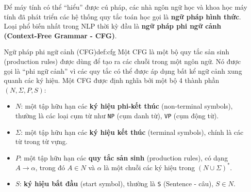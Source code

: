 Để máy tính có thể “hiểu” được cú pháp, các nhà ngôn ngữ học và khoa học máy tính đã phát triển các hệ thống quy tắc toán học gọi là \textbf{ngữ pháp hình thức}. Loại phổ biến nhất trong NLP thời kỳ đầu là \textbf{ngữ pháp phi ngữ cảnh (Context-Free Grammar - CFG)}.

\begin{definition}{Ngữ pháp phi ngữ cảnh (CFG)}{def:cfg}
    Một CFG là một bộ quy tắc sản sinh (production rules) được dùng để tạo ra các chuỗi trong một ngôn ngữ. Nó được gọi là “phi ngữ cảnh” vì các quy tắc có thể được áp dụng bất kể ngữ cảnh xung quanh các ký hiệu. Một CFG được định nghĩa bởi một bộ 4 thành phần $(N, \Sigma, P, S)$:
    \begin{itemize}
        \item $N$: một tập hữu hạn các \textbf{ký hiệu phi-kết thúc} (non-terminal symbols), thường là các loại cụm từ như \texttt{NP} (cụm danh từ), \texttt{VP} (cụm động từ).
        \item $\Sigma$: một tập hữu hạn các \textbf{ký hiệu kết thúc} (terminal symbols), chính là các từ trong từ vựng.
        \item $P$: một tập hữu hạn các \textbf{quy tắc sản sinh} (production rules), có dạng $A \rightarrow \alpha$, trong đó $A \in N$ và $\alpha$ là một chuỗi các ký hiệu trong $(N \cup \Sigma)^*$.
        \item $S$: \textbf{ký hiệu bắt đầu} (start symbol), thường là \texttt{S} (Sentence - câu), $S \in N$.
    \end{itemize}
\end{definition}

